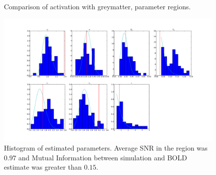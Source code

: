 \documentclass[journal]{./IEEEtran}
\begin{document}
\begin{figure}[!t]
\hfil
{}
\caption{Comparison of activation with greymatter, parameter regions.}
\label{fig:simslice_hm}
\end{figure}

\begin{figure}[!t] %
\centering
\includegraphics[clip=true,trim=2.5cm 2cm 2cm 1cm,width=15cm]{sec2hist}
\caption{Histogram of estimated parameters. Average SNR in the region was 
$0.97$ and Mutual Information between simulation and BOLD estimate was greater 
than $0.15$.}
\label{fig:slicesim_hist2}
\end{figure}
\end{document}
